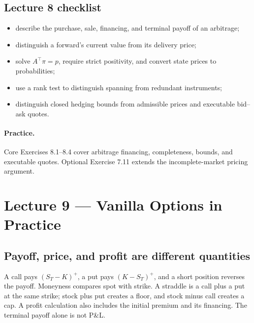 \subsection*{Lecture 8 checklist}
\begin{itemize}[leftmargin=1.5em,itemsep=0.15em]
\item describe the purchase, sale, financing, and terminal payoff of an arbitrage;
\item distinguish a forward's current value from its delivery price;
\item solve \(A^\top\pi=p\), require strict positivity, and convert state prices to probabilities;
\item use a rank test to distinguish spanning from redundant instruments;
\item distinguish closed hedging bounds from admissible prices and executable bid--ask quotes.
\end{itemize}
\paragraph{Practice.} Core Exercises 8.1--8.4 cover arbitrage financing,
completeness, bounds, and executable quotes. Optional Exercise 7.11
extends the incomplete-market pricing argument.

\section{Lecture 9 --- Vanilla Options in Practice}
\label{syn:lecture9}

\subsection{Payoff, price, and profit are different quantities}
A call pays \((S_T-K)^+\), a put pays \((K-S_T)^+\), and a short position
reverses the payoff. Moneyness compares spot with strike. A straddle is a
call plus a put at the same strike; stock plus put creates a floor, and
stock minus call creates a cap. A profit calculation also includes the
initial premium and its financing. The terminal payoff alone is not P\&L.

